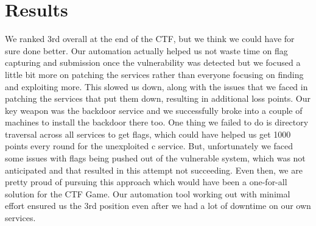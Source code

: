\documentclass[12pt]{report}
\begin{document}
\section*{Results}
We ranked 3rd overall at the end of the CTF, but we think we could have for sure done better. Our automation actually helped us not waste time on flag capturing and submission once the vulnerability was detected but we focused a little bit more on patching the services rather than everyone focusing on finding and exploiting more. This slowed us down, along with the issues that we faced in patching the services that put them down, resulting in additional loss points. Our key weapon was the backdoor service and we successfully broke into a couple of machines to install the backdoor there too. One thing we failed to do is directory traversal across all services to get flags, which could have helped us get 1000 points every round for the unexploited c service. But, unfortunately we faced some issues with flags being pushed out of the vulnerable system, which was not anticipated and that resulted in this attempt not succeeding. Even then, we are pretty proud of pursuing this approach which would have been a one-for-all solution for the CTF Game. Our automation tool working out with minimal effort ensured us the 3rd position even after we had a lot of downtime on our own services.

\end{document}
